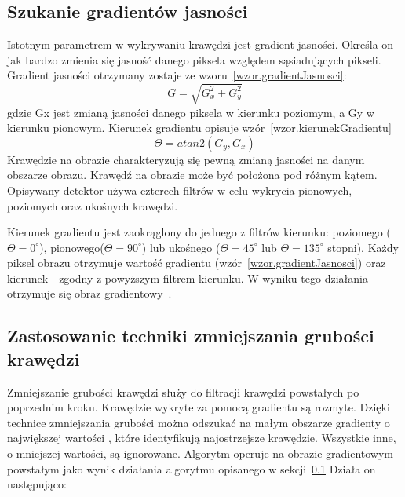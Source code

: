 \documentclass[a4paper,twoside,12pt]{book}
\begin{document}
    \subsection{Szukanie gradientów jasności}\label{subsec:szukanie-gradientów-jasności}
    Istotnym parametrem w wykrywaniu krawędzi jest gradient jasności.
    Określa on jak bardzo zmienia się jasność danego piksela względem sąsiadujących pikseli.
    Gradient jasności otrzymany zostaje ze wzoru~\ref{wzor.gradientJasnosci}:
    \large
    \begin{equation}
        G = \sqrt{G_{x}^{2} + G_{y}^{2}}
        \label{wzor.gradientJasnosci}
    \end{equation}
    \normalsize
    gdzie Gx jest zmianą jasności danego piksela w kierunku poziomym, a Gy w kierunku pionowym.
    Kierunek gradientu opisuje wzór~\ref{wzor.kierunekGradientu}
    \large
    \begin{equation}
        \Theta = atan2(G_{y}, G_{x})
        \label{wzor.kierunekGradientu}
    \end{equation}
    \normalsize
    Krawędzie na obrazie charakteryzują się pewną zmianą jasności na danym obszarze obrazu.
    Krawędź na obrazie może być położona pod różnym kątem.
    Opisywany detektor używa czterech filtrów w celu wykrycia pionowych, poziomych oraz ukośnych krawędzi.

    Kierunek gradientu jest zaokrąglony do jednego z filtrów kierunku: poziomego ($\Theta = 0^{\circ}$),
    pionowego($\Theta = 90^{\circ}$) lub ukośnego ($\Theta = 45^{\circ}$
    lub $\Theta = 135^{\circ}$ stopni).
    Każdy piksel obrazu otrzymuje wartość gradientu (wzór~\ref{wzor.gradientJasnosci})
    oraz kierunek - zgodny z powyższym filtrem kierunku.
    W wyniku tego działania otrzymuje się obraz gradientowy~\cite{Canny}.
    \subsection{Zastosowanie techniki zmniejszania grubości
    krawędzi}\label{subsec:zastosowanie-zmniejszania-grubości-krawędzi}
    Zmniejszanie grubości krawędzi służy do filtracji krawędzi powstałych po poprzednim kroku.
    Krawędzie wykryte za pomocą gradientu są rozmyte.
    Dzięki technice zmniejszania grubości można odszukać na małym obszarze gradienty o największej wartości
    , które identyfikują najostrzejsze krawędzie.
    Wszystkie inne, o mniejszej wartości, są ignorowane.
    Algorytm operuje na obrazie gradientowym powstałym jako wynik działania algorytmu opisanego w sekcji~\ref{subsec:szukanie-gradientów-jasności}
    Działa on następująco:
\end{document}
